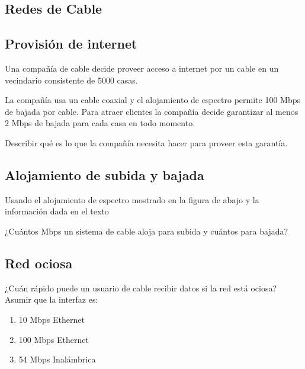 \documentclass[12pt]{report}
\begin{document}
\begin{exer}
	\section{Redes de Cable}
	\subsection{Provisión de internet \stwo}
	Una compañía de cable decide proveer acceso a internet por un cable en un vecindario consistente de 5000 casas.

	La compañía usa un cable coaxial y el alojamiento de espectro permite 100 Mbps de bajada por cable. Para atraer clientes la compañía decide garantizar al menos 2 Mbps de bajada para cada casa en todo momento.

	Describir qué es lo que la compañía necesita hacer para proveer esta garantía.
\end{exer}

\begin{exer}
	\subsection{Alojamiento de subida y bajada \sthree}
	Usando el alojamiento de espectro mostrado en la figura de abajo y la información
	dada en el texto


	¿Cuántos Mbps un sistema de cable aloja para subida y cuántos para bajada?
\end{exer}

\begin{exer}
	\subsection{Red ociosa \sthree}
	¿Cuán rápido puede un usuario de cable recibir datos si la red está ociosa? Asumir
	que la interfaz es:

	\begin{enumerate}
		\item 10 Mbps Ethernet
		\item 100 Mbps Ethernet
		\item 54 Mbps Inalámbrica
	\end{enumerate}
\end{exer}
\end{document}
